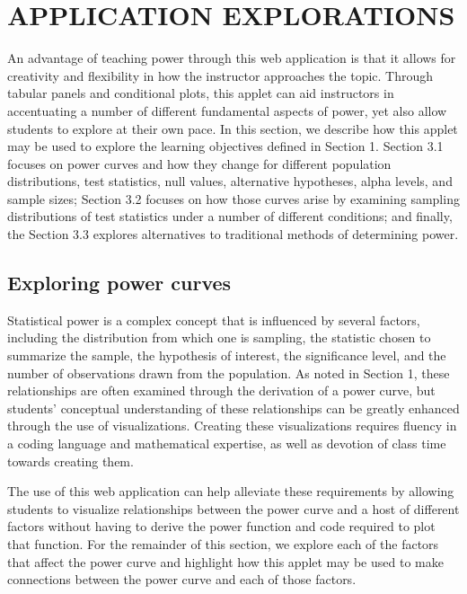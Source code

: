 \documentclass{TISE}
\begin{document}
\section{APPLICATION EXPLORATIONS}

An advantage of teaching power through this web application is that it allows for creativity and flexibility in how the instructor approaches the topic. Through tabular panels and conditional plots, this applet can aid instructors in accentuating a number of different fundamental aspects of power, yet also allow students to explore at their own pace. In this section, we describe how this applet may be used to explore the learning objectives defined in Section 1. Section 3.1 focuses on power curves and how they change for different population distributions, test statistics, null values, alternative hypotheses, alpha levels, and sample sizes; Section 3.2 focuses on how those curves arise by examining sampling distributions of test statistics under a number of different conditions; and finally, the Section 3.3 explores alternatives to traditional methods of determining power.

\subsection{Exploring power curves}

Statistical power is a complex concept that is influenced by several factors, including the distribution from which one is sampling, the statistic chosen to summarize the sample, the hypothesis of interest, the significance level, and the number of observations drawn from the population. As noted in Section 1, these relationships are often examined through the derivation of a power curve, but students' conceptual understanding of these relationships can be greatly enhanced through the use of visualizations. Creating these visualizations requires fluency in a coding language and mathematical expertise, as well as devotion of class time towards creating them. 

The use of this web application can help alleviate these requirements by allowing students to visualize relationships between the power curve and a host of different factors without having to derive the power function and code required to plot that function. For the remainder of this section, we explore each of the factors that affect the power curve and highlight how this applet may be used to make connections between the power curve and each of those factors.
\end{document}
